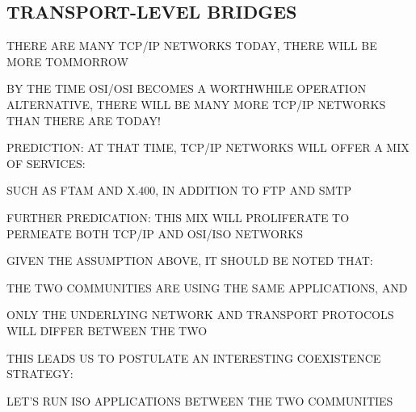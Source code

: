 \begin{bwslide}
\part	{TRANSPORT-LEVEL BRIDGES}
\end{bwslide}


\begin{bwslide}

\begin{nrtc}
\item	THERE ARE MANY TCP/IP NETWORKS TODAY, THERE WILL BE MORE TOMMORROW

\item	BY THE TIME OSI/OSI BECOMES A WORTHWHILE OPERATION ALTERNATIVE,
	THERE WILL BE MANY MORE TCP/IP NETWORKS THAN THERE ARE TODAY!

\item	PREDICTION: AT THAT TIME, TCP/IP NETWORKS WILL
	OFFER A MIX OF SERVICES:
    \begin{nrtc}
    \item	SUCH AS FTAM AND X.400, IN ADDITION TO FTP AND SMTP
    \end{nrtc}

\item	FURTHER PREDICATION: THIS MIX WILL PROLIFERATE TO PERMEATE
	BOTH TCP/IP AND OSI/ISO NETWORKS
\end{nrtc}
\end{bwslide}


\begin{bwslide}

\begin{nrtc}
\item	GIVEN THE ASSUMPTION ABOVE, IT SHOULD BE NOTED THAT:
    \begin{nrtc}
    \item	THE TWO COMMUNITIES ARE USING THE SAME APPLICATIONS,
		AND

    \item	ONLY THE UNDERLYING NETWORK AND TRANSPORT PROTOCOLS WILL
		DIFFER BETWEEN THE TWO
    \end{nrtc}

\item	THIS LEADS US TO POSTULATE AN INTERESTING COEXISTENCE
	STRATEGY:
    \begin{nrtc}
    \item	LET'S RUN ISO APPLICATIONS BETWEEN THE TWO COMMUNITIES
    \end{nrtc}
\end{nrtc}
\end{bwslide}


